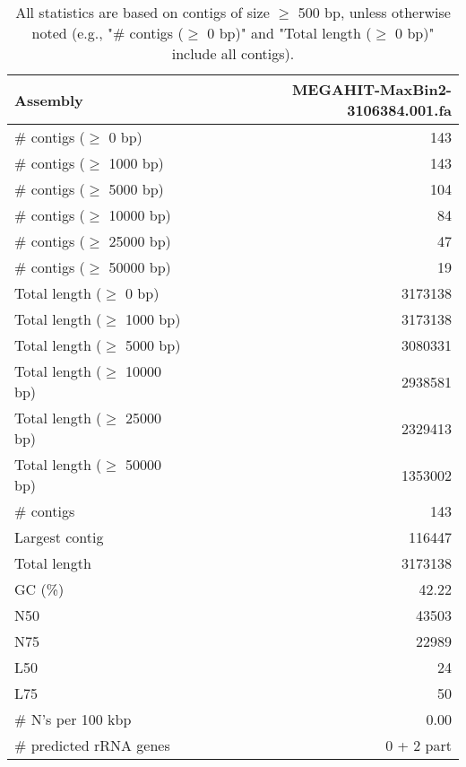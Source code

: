 \documentclass[12pt,a4paper]{article}
\begin{document}
\begin{table}[ht]
\begin{center}
\caption{All statistics are based on contigs of size $\geq$ 500 bp, unless otherwise noted (e.g., "\# contigs ($\geq$ 0 bp)" and "Total length ($\geq$ 0 bp)" include all contigs).}
\begin{tabular}{|l*{1}{|r}|}
\hline
Assembly & MEGAHIT-MaxBin2-3106384.001.fa \\ \hline
\# contigs ($\geq$ 0 bp) & 143 \\ \hline
\# contigs ($\geq$ 1000 bp) & 143 \\ \hline
\# contigs ($\geq$ 5000 bp) & 104 \\ \hline
\# contigs ($\geq$ 10000 bp) & 84 \\ \hline
\# contigs ($\geq$ 25000 bp) & 47 \\ \hline
\# contigs ($\geq$ 50000 bp) & 19 \\ \hline
Total length ($\geq$ 0 bp) & 3173138 \\ \hline
Total length ($\geq$ 1000 bp) & 3173138 \\ \hline
Total length ($\geq$ 5000 bp) & 3080331 \\ \hline
Total length ($\geq$ 10000 bp) & 2938581 \\ \hline
Total length ($\geq$ 25000 bp) & 2329413 \\ \hline
Total length ($\geq$ 50000 bp) & 1353002 \\ \hline
\# contigs & 143 \\ \hline
Largest contig & 116447 \\ \hline
Total length & 3173138 \\ \hline
GC (\%) & 42.22 \\ \hline
N50 & 43503 \\ \hline
N75 & 22989 \\ \hline
L50 & 24 \\ \hline
L75 & 50 \\ \hline
\# N's per 100 kbp & 0.00 \\ \hline
\# predicted rRNA genes & 0 + 2 part \\ \hline
\end{tabular}
\end{center}
\end{table}
\end{document}

